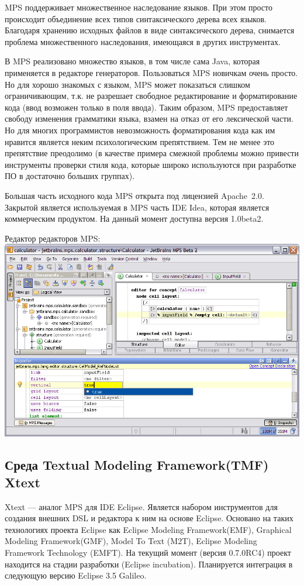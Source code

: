 \documentclass[a4paper,12pt,titlepage]{extarticle}
\begin{document}
MPS поддерживает множественное наследование языков. При этом просто происходит 
объединение всех типов синтаксического дерева всех языков. Благодаря хранению
исходных файлов в виде синтаксического дерева, снимается проблема
множественного наследования, имеющаяся в других инструментах.

В MPS реализовано множество языков, в том числе сама Java, которая применяется
в редакторе генераторов. Пользоваться MPS новичкам очень просто. Но для хорошо
знакомых с языком, MPS может показаться слишком ограничивающим, т.к. не
разрешает свободное редактирование и форматирование кода (ввод возможен только в
поля ввода). Таким образом, MPS предоставляет свободу изменения грамматики
языка, взамен на отказ от его лексической части. Но для многих программистов
невозможность форматирования кода как им нравится является неким психологическим
препятствием. Тем не менее это препятствие преодолимо (в качестве примера
смежной проблемы можно привести инструменты проверки стиля кода, которые широко
используются при разработке ПО в достаточно больших группах).

Большая часть исходного кода MPS открыта под лицензией Apache~2.0. Закрытой
является используемая в MPS часть IDE Idea, которая является коммерческим
продуктом.
На данный момент доступна версия 1.0beta2.

\begin{center}
Редактор редакторов MPS:\\
\includegraphics[scale=0.4]{img/mps.png}
\end{center}

\subsection{Среда Textual Modeling Framework(TMF) Xtext}
Xtext --- аналог MPS для IDE Eclipse. Является набором инструментов для
создания внешних DSL и редактора к ним на основе Eclipse. Основано на
таких технологиях проекта Eclipse как Eclipse Modeling Framework(EMF),
Graphical Modeling Framework(GMF), Model To Text (M2T), Eclipse Modeling
Framework Technology (EMFT). На текущий момент (версия 0.7.0RC4) проект
находится на стадии разработки (Eclipse incubation). Планируется интеграция в следующую
версию Eclipse 3.5 Galileo.
\end{document}
